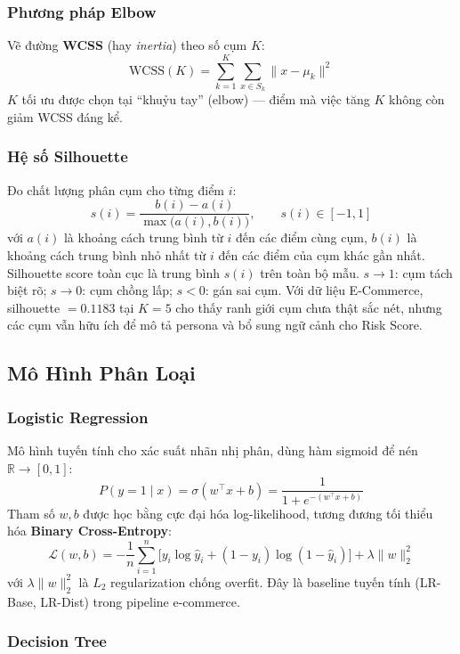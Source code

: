 \documentclass[12pt,a4paper]{article}
\begin{document}
\subsubsection{Phương pháp Elbow}

Vẽ đường \textbf{WCSS} (hay \textit{inertia}) theo số cụm $K$:
\[
  \text{WCSS}(K) = \sum_{k=1}^{K}\sum_{x \in S_k} \lVert x - \mu_k \rVert^2
\]
$K$ tối ưu được chọn tại ``khuỷu tay'' (elbow) --- điểm mà việc tăng $K$ không còn giảm WCSS đáng kể.

\subsubsection{Hệ số Silhouette}

Đo chất lượng phân cụm cho từng điểm $i$:
\[
  s(i) = \dfrac{b(i) - a(i)}{\max\big(a(i), b(i)\big)}, \qquad s(i) \in [-1, 1]
\]
với $a(i)$ là khoảng cách trung bình từ $i$ đến các điểm cùng cụm, $b(i)$ là khoảng cách trung bình
nhỏ nhất từ $i$ đến các điểm của cụm khác gần nhất. Silhouette score toàn cục là trung bình
$s(i)$ trên toàn bộ mẫu. $s \to 1$: cụm tách biệt rõ; $s \to 0$: cụm chồng lấp; $s < 0$: gán sai
cụm. Với dữ liệu E-Commerce, silhouette $=0.1183$ tại $K=5$ cho thấy ranh giới cụm chưa thật sắc
nét, nhưng các cụm vẫn hữu ích để mô tả persona và bổ sung ngữ cảnh cho Risk Score.

\subsection{Mô Hình Phân Loại}

\subsubsection{Logistic Regression}

Mô hình tuyến tính cho xác suất nhãn nhị phân, dùng hàm sigmoid để nén $\mathbb{R} \to [0,1]$:
\[
  P(y=1\mid x) = \sigma(w^\top x + b) = \dfrac{1}{1+e^{-(w^\top x + b)}}
\]
Tham số $w, b$ được học bằng cực đại hóa log-likelihood, tương đương tối thiểu hóa \textbf{Binary
Cross-Entropy}:
\[
  \mathcal{L}(w,b) = -\dfrac{1}{n}\sum_{i=1}^n \Big[y_i \log \hat{y}_i + (1-y_i)\log(1-\hat{y}_i)\Big] + \lambda \lVert w \rVert_2^2
\]
với $\lambda \lVert w\rVert_2^2$ là $L_2$ regularization chống overfit. Đây là baseline tuyến
tính (LR-Base, LR-Dist) trong pipeline e-commerce.

\subsubsection{Decision Tree}
\end{document}
